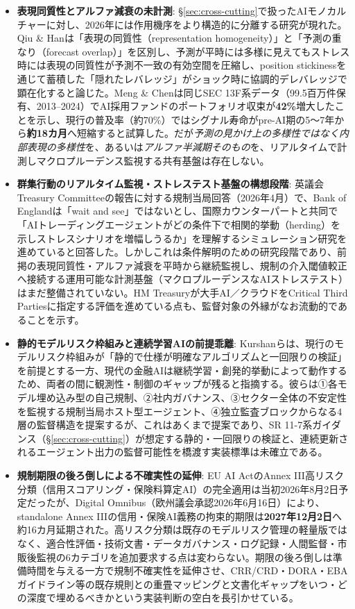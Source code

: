 \begin{itemize}
  \item \textbf{表現同質性とアルファ減衰の未計測}: \S\ref{sec:cross-cutting}で扱ったAIモノカルチャー\cite{aisystemicrisk2026}に対し、2026年には作用機序をより構造的に分離する研究が現れた。Qiu \& Han\cite{x07homogeneity2026}は「表現の同質性（representation homogeneity）」と「予測の重なり（forecast overlap）」を区別し、予測が平時には多様に見えてもストレス時には表現の同質性が予測不一致の有効空間を圧縮し、position stickinessを通じて蓄積した「隠れたレバレッジ」がショック時に協調的デレバレッジで顕在化すると論じた。Meng \& Chen\cite{x07alphadecay2026}は同じSEC 13F系データ（99.5百万件保有、2013--2024）でAI採用ファンドのポートフォリオ収束が\textbf{42\%}増大したことを示し、現行の普及率（約70\%）ではシグナル寿命がpre-AI期の5〜7年から\textbf{約18カ月}へ短縮すると試算した。だが\emph{予測の見かけ上の多様性ではなく内部表現の多様性}を、あるいは\emph{アルファ半減期そのもの}を、リアルタイムで計測しマクロプルーデンス監視する共有基盤は存在しない。
  \item \textbf{群集行動のリアルタイム監視・ストレステスト基盤の構想段階}: 英議会Treasury Committeeの報告に対する規制当局回答（2026年4月）で、Bank of Englandは「wait and see」ではないとし、国際カウンターパートと共同で「AIトレーディングエージェントがどの条件下で相関的挙動（herding）を示しストレスシナリオを増幅しうるか」を理解するシミュレーション研究を進めていると回答した\cite{x07tsc2026}。しかしこれは条件解明のための研究段階であり、前掲の表現同質性・アルファ減衰を平時から継続監視し、規制の介入閾値較正へ接続する運用可能な計測基盤（マクロプルーデンスなAIストレステスト）はまだ整備されていない。HM Treasuryが大手AI／クラウドをCritical Third Partiesに指定する評価を進めている点も、監督対象の外縁がなお流動的であることを示す。
  \item \textbf{静的モデルリスク枠組みと連続学習AIの前提乖離}: Kurshanら\cite{x07agenticregulator2025}は、現行のモデルリスク枠組みが「静的で仕様が明確なアルゴリズムと一回限りの検証」を前提とする一方、現代の金融AIは継続学習・創発的挙動によって動作するため、両者の間に観測性・制御のギャップが残ると指摘する。彼らは①各モデル埋め込み型の自己規制、②社内ガバナンス、③セクター全体の不安定性を監視する規制当局ホスト型エージェント、④独立監査ブロックからなる4層の監督構造を提案するが、これはあくまで提案であり、SR 11-7系ガイダンス（\S\ref{sec:cross-cutting}）が想定する静的・一回限りの検証と、連続更新されるエージェント出力の監督可能性を橋渡す実装標準は未確立である。
  \item \textbf{規制期限の後ろ倒しによる不確実性の延伸}: EU AI ActのAnnex III高リスク分類（信用スコアリング・保険料算定AI）の完全適用は当初2026年8月2日予定だったが、Digital Omnibus（欧州議会承認2026年6月16日）により、standalone Annex IIIの信用・保険AI義務の拘束的期限は\textbf{2027年12月2日}へ約16カ月延期された\cite{x07digitalomnibus2026}。高リスク分類は既存のモデルリスク管理の軽量版ではなく、適合性評価・技術文書・データガバナンス・ログ記録・人間監督・市販後監視の6カテゴリを追加要求する点は変わらない。期限の後ろ倒しは準備時間を与える一方で規制不確実性を延伸させ、CRR/CRD・DORA・EBAガイドライン等の既存規則との重畳マッピングと文書化ギャップをいつ・どの深度で埋めるべきかという実装判断の空白を長引かせている。

\end{itemize}
